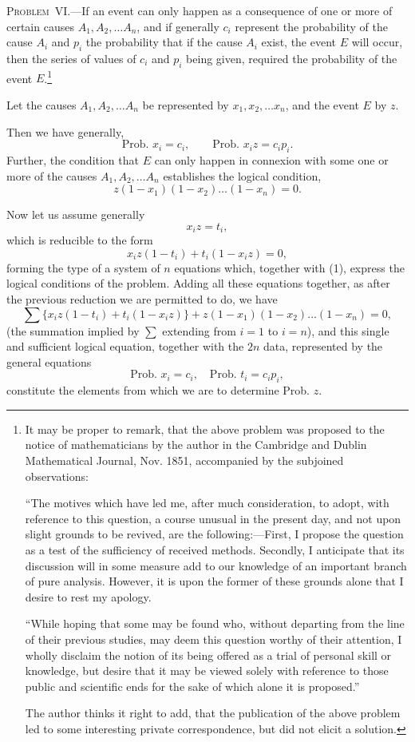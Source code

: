 \documentclass[oneside]{book}
\begin{document}
\textsc{Problem~VI.}---If an event can only happen as a consequence of one or more of certain causes $A_1, A_2, \dotsc A_n$, and if
generally $c_i$ represent the probability of the cause $A_i$ and $p_i$ the
probability that if the cause $A_i$ exist, the event $E$ will occur,
then the series of values of $c_i$ and $p_i$ being given, required the
probability of the event $E$.\footnote{
 It may be proper to remark, that the above problem was proposed to the
notice of mathematicians by the author in the Cambridge and Dublin Mathematical Journal, Nov. 1851, accompanied by the subjoined observations:

``The motives which have led me, after much consideration, to adopt, with
reference to this question, a course unusual in the present day, and not upon
slight grounds to be revived, are the following:---First, I propose the question
as a test of the sufficiency of received methods. Secondly, I anticipate that its
discussion will in some measure add to our knowledge of an important branch
of pure analysis. However, it is upon the former of these grounds alone that I
desire to rest my apology.

``While hoping that some may be found who, without departing from the line
of their previous studies, may deem this question worthy of their attention, I
wholly disclaim the notion of its being offered as a trial of personal skill or
knowledge, but desire that it may be viewed solely with reference to those public and scientific ends for the sake of which alone it is proposed.''

The author thinks it right to add, that the publication of the above problem
led to some interesting private correspondence, but did not elicit a solution.}%

Let the causes $A_1, A_2, \dotsc A_n$ be represented by
$x_1, x_2, \dotsc x_n$,
and the event $E$ by $z$.

Then we have generally,
\[
  \text{Prob. }x_i = c_i,\qquad  \text{Prob. }x_i z = c_i p_i.
\]
Further, the condition that $E$ can only happen in connexion with
some one or more of the causes $A_1, A_2, \dotsc A_n$ establishes the logical condition,
\[
  z(1-x_1)(1-x_2) \dotsc (1-x_n) = 0.   \tag{1}
\]

Now let us assume generally
\[
  x_i z = t_i,
\]
which is reducible to the form
\[
  x_i z(1-t_i) + t_i(1-x_i z) = 0,
\]
forming the type of a system of $n$ equations which, together with
(1), express the logical conditions of the problem. Adding all
these equations together, as after the previous reduction we are
permitted to do, we have
\[
  \sum\{ x_i z(1-t_i) + t_i(1-x_i z) \}
  + z(1-x_1)(1-x_2) \dotsc (1-x_n) = 0,   \tag{2}
\]
(the summation implied by $\sum$ extending from $i = 1$ to $i = n$), and
this single and sufficient logical equation, together with the $2n$
data, represented by the general equations
\[
  \text{Prob. }x_i = c_i,\quad \text{Prob. }t_i = c_i p_i,  \tag{3}
\]
constitute the elements from which we are to determine Prob. $z$.
\end{document}
